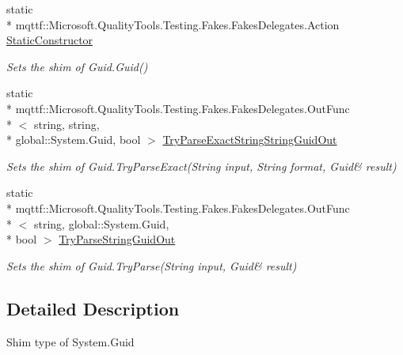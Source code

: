 \begin{DoxyCompactItemize}
static \\*
mqttf\-::\-Microsoft.\-Quality\-Tools.\-Testing.\-Fakes.\-Fakes\-Delegates.\-Action \hyperlink{class_system_1_1_fakes_1_1_shim_guid_a44ddc6f53d83a8c5921a0796efc8e482}{Static\-Constructor}
\begin{DoxyCompactList}\small\item\em Sets the shim of Guid.\-Guid()\end{DoxyCompactList}\item 
static \\*
mqttf\-::\-Microsoft.\-Quality\-Tools.\-Testing.\-Fakes.\-Fakes\-Delegates.\-Out\-Func\\*
$<$ string, string, \\*
global\-::\-System.\-Guid, bool $>$ \hyperlink{class_system_1_1_fakes_1_1_shim_guid_ae0756d6709d6eeb2a70048c30df1d162}{Try\-Parse\-Exact\-String\-String\-Guid\-Out}
\begin{DoxyCompactList}\small\item\em Sets the shim of Guid.\-Try\-Parse\-Exact(String input, String format, Guid\& result)\end{DoxyCompactList}\item 
static \\*
mqttf\-::\-Microsoft.\-Quality\-Tools.\-Testing.\-Fakes.\-Fakes\-Delegates.\-Out\-Func\\*
$<$ string, global\-::\-System.\-Guid, \\*
bool $>$ \hyperlink{class_system_1_1_fakes_1_1_shim_guid_a869ffb96b203467d49005557e1ac6788}{Try\-Parse\-String\-Guid\-Out}
\begin{DoxyCompactList}\small\item\em Sets the shim of Guid.\-Try\-Parse(String input, Guid\& result)\end{DoxyCompactList}\end{DoxyCompactItemize}


\subsection{Detailed Description}
Shim type of System.\-Guid



